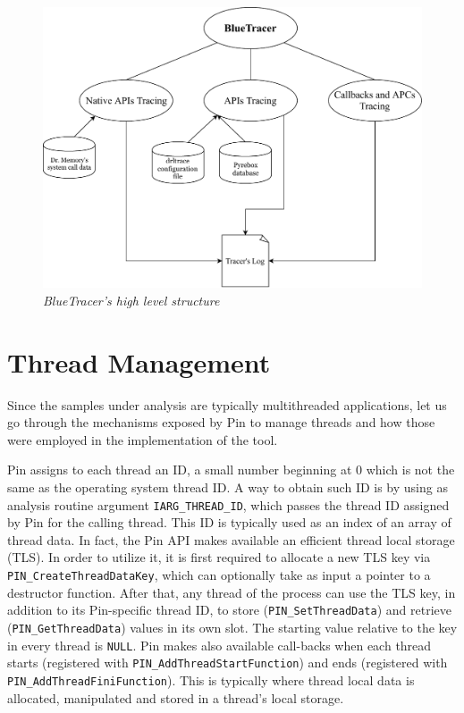 \documentclass[binding=0.6cm,LaM,english,noexaminfo,oneside]{sapthesis} %
\begin{document}
\begin{figure}[h]
\centering
\includegraphics[scale=0.8]{Figures/BlueTracer.pdf}
\caption{\textit{BlueTracer's high level structure}}
\end{figure}

\section{Thread Management}

Since the samples under analysis are typically multithreaded applications, let us go through the mechanisms exposed by Pin to manage threads and how those were employed in the implementation of the tool.

Pin assigns to each thread an ID, a small number beginning at 0
which is not the same as the operating system thread ID. A way to obtain such ID is by using as analysis routine argument \texttt{IARG\_THREAD\_ID}, which passes the thread ID assigned by Pin for the calling thread. This ID is typically used as an index of an array of thread data.
In fact, the Pin API makes available an efficient thread local storage (TLS). In order to utilize it, it is first required to allocate a new TLS key via \texttt{PIN\_CreateThreadDataKey}, which can optionally take as input a pointer to a destructor function. After that, any thread of the process can use the TLS key, in addition to its Pin-specific thread ID, to store (\texttt{PIN\_SetThreadData}) and retrieve (\texttt{PIN\_GetThreadData}) values in its own slot. The starting value relative to the key in every thread is \texttt{NULL}.
Pin makes also available call-backs when each thread starts (registered with \texttt{PIN\_AddThreadStartFunction}) and ends (registered with \texttt{PIN\_AddThreadFiniFunction}). This is typically where thread local data is allocated, manipulated and stored in a thread's local storage\cite{Pin}.
\end{document}
